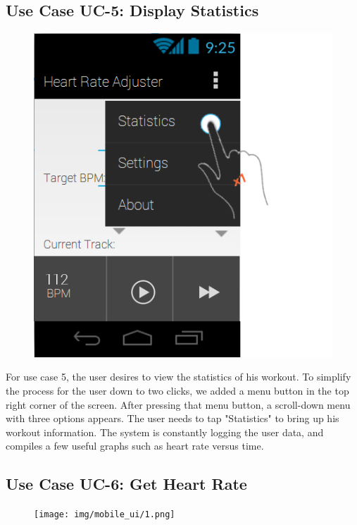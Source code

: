 \documentclass[letterpaper,english, 12pt]{scrreprt}
\begin{document}
\subsection{Use Case UC-5: Display Statistics}

\begin{figure}[H]
	\centering
	\includegraphics{img/Prelim_Design/PrelimDesign_4.png}\\
\end{figure}

For use case 5, the user desires to view the statistics of his workout.
To simplify the process for the user down to two clicks, we added a menu button in the top right corner of the screen.
After pressing that menu button, a scroll-down menu with three options appears.
The user needs to tap "Statistics" to bring up his workout information.
The system is constantly logging the user data, and compiles a few useful graphs such as heart rate versus time.

\subsection{Use Case UC-6: Get Heart Rate}
\begin{figure}[H]
	\centering
	\texttt{[image: img/mobile\_ui/1.png]}\\
\end{figure}
\end{document}
